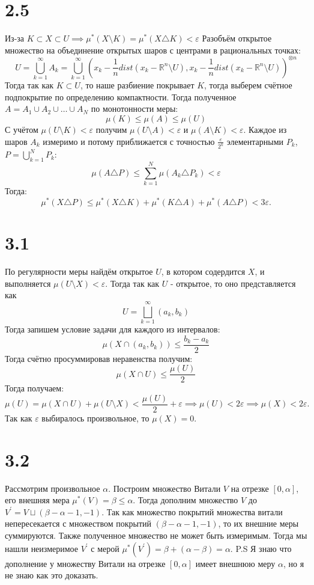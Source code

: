 \documentclass[12pt]{article}
\begin{document}
\section{2.5}
Из-за $K \subset X \subset U \implies \mu^{\ast} (X \setminus K) = \mu^{\ast} (X \triangle K) < \varepsilon$ 
Разобъём открытое множество на объединение открытых шаров с центрами в рациональных точках: 
\[
    U = \bigcup_{k=1}^{\infty} A_k =  \bigcup_{k=1}^{\infty} (x_k - \frac{1}{n} dist(x_k - \mathbb{R}^n \setminus U), x_k - \frac{1}{n} dist(x_k - \mathbb{R}^n \setminus U))^{\otimes n}
\]
Тогда так как $K \subset U$, то наше разбиение покрывает $K$, тогда выберем счётное подпокрытие по определению 
компактности. Тогда полученное $A = A_1 \cup A_2 \cup \dots \cup A_N$ по монотонности меры: 
\[
    \mu(K) \leq \mu(A) \leq \mu(U)
\]
С учётом $\mu(U \setminus K) < \varepsilon$ получим $\mu(U \setminus A) < \varepsilon$ и $\mu(A \setminus K) < \varepsilon$. 
Каждое из шаров $A_k$ измеримо и потому приближается с точностью $\frac{\varepsilon}{2^k}$ элементарными $P_k$, $P = \bigcup_{k=1}^{N} P_k$: 
\[
    \mu(A \triangle P) \leq \sum_{k=1}^{N} \mu(A_k \triangle P_k) < \varepsilon
\]
Тогда: 
\[
    \mu^{\ast} (X \triangle P) \leq \mu^{\ast} (X \triangle K) + \mu^{\ast} (K \triangle A) + \mu^{\ast} (A \triangle P) < 3 \varepsilon.
\]
\section{3.1}
По регулярности меры найдём открытое $U$, в котором содердится $X$, и выполняется $\mu(U \setminus X) < \varepsilon$. 
Тогда так как $U$ - открытое, то оно представляется как 
\[
    U = \bigsqcup_{k=1}^{\infty} (a_k, b_k)
\]    
Тогда запишем условие задачи для каждого из интервалов:
\[
    \mu(X \cap (a_k, b_k)) \leq \frac{b_k - a_k}{2}
\] 
Тогда счётно просуммировав неравенства получим: 
\[
    \mu(X \cap U) \leq \frac{\mu (U)}{2}
\]
Тогда получаем: 
\[
    \mu(U) = \mu(X \cap U) + \mu(U \setminus X) < \frac{\mu (U)}{2} + \varepsilon \implies 
    \mu(U) < 2\varepsilon \implies \mu(X) < 2\varepsilon.
\]
Так как $\varepsilon$ выбиралось произвольное, то $\mu (X) = 0$.  


\section{3.2}
Рассмотрим произвольное $\alpha$. Построим множество Витали $V$ на отрезке $[0, \alpha]$, его внешняя мера
$\mu^{\ast}(V) = \beta \leq \alpha$. Тогда дополним множество $V$ до $V^{\prime} = V \sqcup (\beta - \alpha - 1, -1)$. 
Так как множество покрытий множества витали непересекается с множеством покрытий $(\beta - \alpha - 1, -1)$, то 
их внешние меры суммируются. Также полученное множество не может быть измеримым. Тогда мы нашли неизмеримое 
$V^{\prime}$ с мерой $\mu^{\ast}(V^{\prime}) = \beta + (\alpha - \beta) = \alpha$. 
P.S Я знаю что дополнение у множеству Витали на отрезке $[0, \alpha]$ имеет внешнюю меру $\alpha$, но я не знаю как 
это доказать.    
\end{document}
